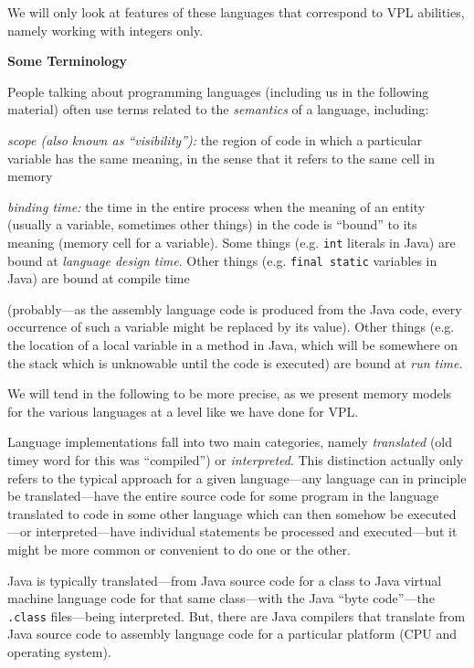 We will only look at features of these languages that correspond to
VPL abilities, namely working with integers only.
\medskip

 {\bf Some Terminology}
 \medskip
 
 People talking about programming languages (including us in the following material) often use terms related to
 the {\it semantics\/} of a language, including:
 \medskip
 
 {\it scope (also known as ``visibility''):}  the region of code in which a particular variable has the same meaning,
 in the sense that it refers to the same cell in memory
 \medskip
 
 {\it binding time:}  the time in the entire process when the meaning of an entity (usually a variable, sometimes
 other things) in the
 code is ``bound'' to its meaning (memory cell for a variable).
 Some things (e.g. {\tt int} literals in Java) are bound at {\it language design time}.
 Other things (e.g. {\tt final static} variables in Java) are bound at compile time
 
  (probably---as the assembly language code is produced from the Java code, every occurrence of
 such a variable might be replaced by its value).
 \medskip
 \Outdent
 Other things (e.g. the location of a local variable in a method in Java, which will be somewhere on the
 stack which is unknowable until the code is executed) are bound at {\it run time}.
 \bigskip
 \Outdent
 
 We will tend in the following to be more precise, as we present memory models for the various languages
 at a level like we have done for VPL.
 \medskip
 
 Language implementations fall into two main categories, namely {\it translated\/} (old timey word for this
 was ``compiled'') or {\it interpreted}.  This distinction actually only refers to the typical 
 approach for 
 a given
 language---any language can in principle be translated---have the entire
 source code for some program in the language translated to code in
 some other language which can then somehow be executed---or interpreted---have individual statements 
 be processed and executed---but it might be more common or convenient to do one or the other.
 \medskip
 
 Java is typically translated---from Java source code for a class to Java virtual machine language code
 for that same class---with the Java ``byte code''---the {\tt .class} files---being interpreted.
 But, there are Java compilers that translate from Java source code to assembly language code for a
 particular platform (CPU and operating system).
 \border
 
